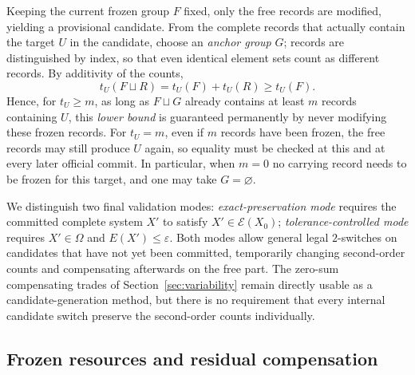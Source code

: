 \documentclass[11pt,a4paper]{article}
\numberwithin{equation}{section}
\theoremstyle{definition}
\numberwithin{algorithm}{section}
\begin{document}
Keeping the current frozen group $F$ fixed, only the free records are modified, yielding a
provisional candidate.
From the complete records that actually contain the target $U$ in the candidate, choose an
\emph{anchor group} $G$; records are distinguished by index, so that even identical element
sets count as different records.
By additivity of the counts,
\begin{equation}
t_U(F\sqcup R)=t_U(F)+t_U(R)\ge t_U(F).
\label{eq:anchor-guarantee}
\end{equation}
Hence, for $t_U\ge m$, as long as $F\sqcup G$ already contains at least $m$ records
containing $U$, this \emph{lower bound} is guaranteed permanently by never modifying these
frozen records.
For $t_U=m$, even if $m$ records have been frozen, the free records may still produce $U$
again, so equality must be checked at this and at every later official commit.
In particular, when $m=0$ no carrying record needs to be frozen for this target, and one may
take $G=\varnothing$.

We distinguish two final validation modes:
\emph{exact-preservation mode} requires the committed complete system $X'$ to satisfy
$X'\in\mathcal E(X_0)$;
\emph{tolerance-controlled mode} requires $X'\in\Omega$ and $E(X')\le\varepsilon$.
Both modes allow general legal $2$-switches on candidates that have not yet been committed,
temporarily changing second-order counts and compensating afterwards on the free part.
The zero-sum compensating trades of Section~\ref{sec:variability} remain directly usable as a
candidate-generation method, but there is no requirement that every internal candidate switch
preserve the second-order counts individually.

\subsection{Frozen resources and residual compensation}\label{subsec:directed-residual}
\end{document}
